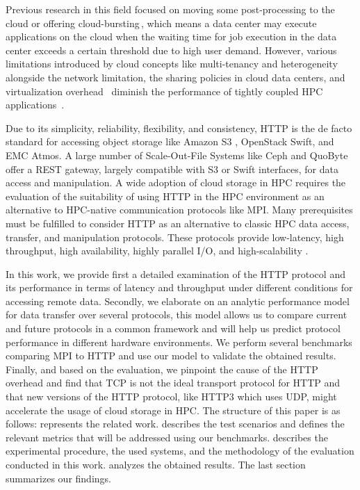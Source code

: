 \documentclass[runningheads]{llncs}
\begin{document}
Previous research in this field focused on moving some post-processing to the cloud or offering cloud-bursting\,\cite{lafayetteexploring}, which means a data center may execute applications on the cloud when the waiting time for job execution in the data center exceeds a certain threshold due to high user demand. However, various limitations introduced by cloud concepts like multi-tenancy and heterogeneity \,\cite{gupta2013improving} alongside the network limitation, the sharing policies in cloud data centers, and virtualization overhead \,\cite{performanceAnalysisHPCinCloud} diminish the performance of tightly coupled HPC applications \,\cite{evangelinos2008cloud}.

Due to its simplicity, reliability, flexibility, and consistency, HTTP is the de facto standard for accessing object storage like Amazon S3 \cite{awsS3Url}, OpenStack Swift, and EMC Atmos. A large number of Scale-Out-File Systems like Ceph and QuoByte offer a REST gateway, largely compatible with S3 or Swift interfaces, for data access and manipulation. A wide adoption of cloud storage in HPC requires the evaluation of  the suitability of using HTTP in the HPC environment as an alternative to HPC-native communication protocols like MPI.
Many prerequisites must be fulfilled to consider HTTP as an alternative to classic HPC data access, transfer, and manipulation protocols. These protocols provide low-latency, high throughput, high availability, highly parallel I/O, and high-scalability \cite{Devresse}. 

In this work, we provide first a detailed examination of the HTTP protocol and its performance in terms of latency and throughput under different conditions for accessing remote data. Secondly, we elaborate on an analytic performance model for data transfer over several protocols, this model allows us to compare current and future protocols in a common framework and will help us predict protocol performance in different hardware environments. We perform several benchmarks comparing MPI to HTTP and use our model to validate the obtained results. Finally, and based on the evaluation, we pinpoint the cause of the HTTP overhead and find that TCP is not the ideal transport protocol for HTTP and that new versions of the HTTP protocol, like HTTP3 which uses UDP, might accelerate the usage of cloud storage in HPC.
The structure of this paper is as follows:  represents the related work.  describes the test scenarios and defines the relevant metrics that will be addressed using our benchmarks.  describes the experimental procedure, the used systems, and the methodology of the evaluation conducted in this work.  analyzes the obtained results. The last section summarizes our findings.
\end{document}
